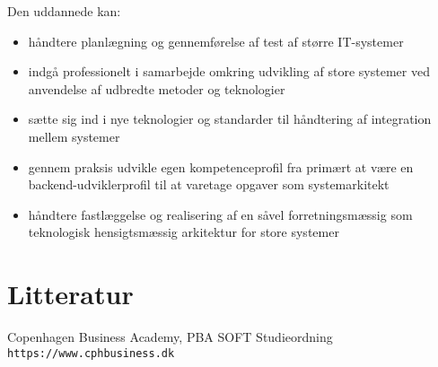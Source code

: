 \documentclass[11pt]{article}
\begin{document}
Den uddannede kan:
\begin{itemize}
\item håndtere planlægning og gennemførelse af test af større IT-systemer
\item indgå professionelt i samarbejde omkring udvikling af store systemer ved
anvendelse af udbredte metoder og teknologier
\item sætte sig ind i nye teknologier og standarder til håndtering af integration
mellem systemer
\item gennem praksis udvikle egen kompetenceprofil fra primært at være en
backend-udviklerprofil til at varetage opgaver som systemarkitekt
\item håndtere fastlæggelse og realisering af en såvel forretningsmæssig som
teknologisk hensigtsmæssig arkitektur for store systemer
\end{itemize}

\clearpage
\section{Litteratur}
\begin{thebibliography}{9}
    Copenhagen Business Academy, PBA SOFT Studieordning
    \\\texttt{https://www.cphbusiness.dk}
\end{thebibliography}
\end{document}
